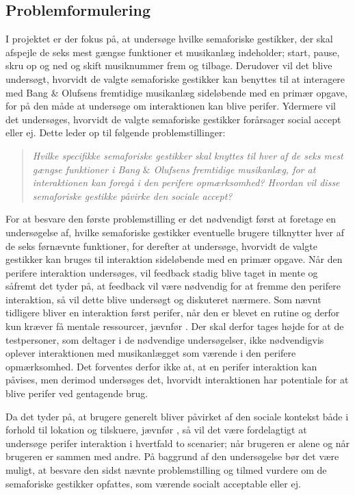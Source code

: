 \subsection{Problemformulering}
\label{Problemformulering}
%
I projektet er der fokus på, at undersøge hvilke semaforiske gestikker, der skal afspejle de seks mest gængse funktioner et musikanlæg indeholder; start, pause, skru op og ned og skift musiknummer frem og tilbage. Derudover vil det blive undersøgt, hvorvidt de valgte semaforiske gestikker kan benyttes til at interagere med Bang $\&$ Olufsens fremtidige musikanlæg sideløbende med en primær opgave, for på den måde at undersøge om interaktionen kan blive perifer. Ydermere vil det undersøges, hvorvidt de valgte semaforiske gestikker forårsager social accept eller ej. Dette leder op til følgende problemstillinger:\blankline
%
\begin{quotation}
	\noindent
	\textit{Hvilke specifikke semaforiske gestikker skal knyttes til hver af de seks mest gængse funktioner i Bang $\&$ Olufsens fremtidige musikanlæg, for at interaktionen kan foregå i den perifere opmærksomhed?\blankline
		Hvordan vil disse semaforiske gestikke påvirke den sociale accept?}\blankline
\end{quotation}
%
For at besvare den første problemstilling er det nødvendigt først at foretage en undersøgelse af, hvilke semaforiske gestikker eventuelle brugere tilknytter hver af de seks førnævnte funktioner, for derefter at undersøge, hvorvidt de valgte gestikker kan bruges til interaktion sideløbende med en primær opgave. Når den perifere interaktion undersøges, vil feedback stadig blive taget in mente og såfremt det tyder på, at feedback vil være nødvendig for at fremme den perifere interaktion, så vil dette blive undersøgt og diskuteret nærmere. Som nævnt tidligere bliver en interaktion først perifer, når den er blevet en rutine og derfor kun kræver få mentale ressourcer, jævnfør . Der skal derfor tages højde for at de testpersoner, som deltager i de nødvendige undersøgelser, ikke nødvendigvis oplever interaktionen med musikanlægget som værende i den perifere opmærksomhed. Det forventes derfor ikke at, at en perifer interaktion kan påvises, men derimod undersøges det, hvorvidt interaktionen har potentiale for at blive perifer ved gentagende brug. 

Da det tyder på, at brugere generelt bliver påvirket af den sociale kontekst både i forhold til lokation og tilskuere, jævnfør , så vil det være fordelagtigt at undersøge perifer interaktion i hvertfald to scenarier; når brugeren er alene og når brugeren er sammen med andre. På baggrund af den undersøgelse bør det være muligt, at besvare den sidst nævnte problemstilling og tilmed vurdere om de semaforiske gestikker opfattes, som værende socialt acceptable eller ej. 





